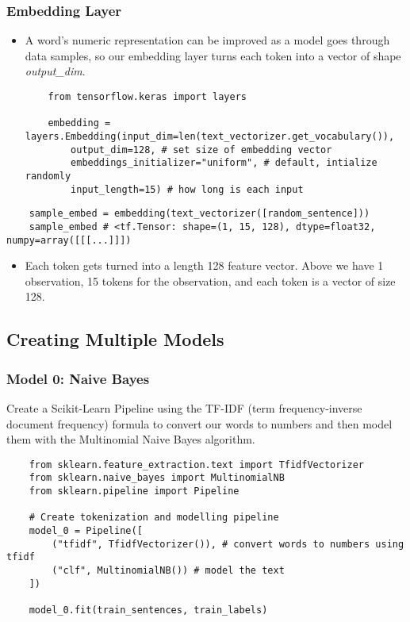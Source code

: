 \documentclass[11pt, a4paper]{article}
\begin{document}
	\subsubsection{Embedding Layer}
	\begin{itemize}
		\item A word's numeric representation can be improved as a model goes through data samples, so our embedding layer turns each token into a vector of shape \textit{output\_dim}.
	\begin{lstlisting}
	from tensorflow.keras import layers
	
	embedding = layers.Embedding(input_dim=len(text_vectorizer.get_vocabulary()),
		output_dim=128, # set size of embedding vector
		embeddings_initializer="uniform", # default, intialize randomly
		input_length=15) # how long is each input \end{lstlisting}
	\end{itemize} \newpage


	\begin{lstlisting}
	sample_embed = embedding(text_vectorizer([random_sentence]))
	sample_embed # <tf.Tensor: shape=(1, 15, 128), dtype=float32, numpy=array([[[...]]])\end{lstlisting}
	\begin{itemize}
		\item Each token gets turned into a length 128 feature vector. Above we have 1 observation, 15 tokens for the observation, and each token is a vector of size 128.
	\end{itemize}

	\subsection{Creating Multiple Models}
	\subsubsection{Model 0: Naive Bayes}
	Create a Scikit-Learn Pipeline using the TF-IDF (term frequency-inverse document frequency) formula to convert our words to numbers and then model them with the Multinomial Naive Bayes algorithm. 
	\begin{lstlisting}
	from sklearn.feature_extraction.text import TfidfVectorizer
	from sklearn.naive_bayes import MultinomialNB
	from sklearn.pipeline import Pipeline
	
	# Create tokenization and modelling pipeline
	model_0 = Pipeline([
		("tfidf", TfidfVectorizer()), # convert words to numbers using tfidf
		("clf", MultinomialNB()) # model the text
	])
	
	model_0.fit(train_sentences, train_labels) \end{lstlisting}
\end{document}
